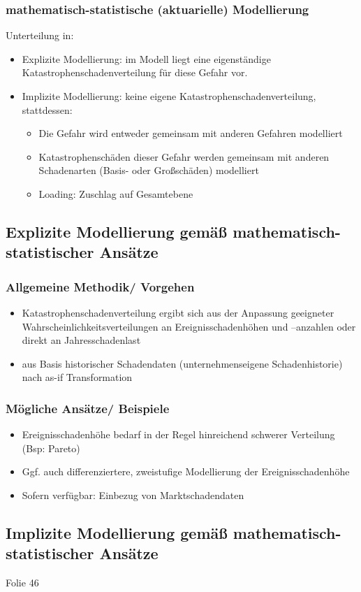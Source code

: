\documentclass[12pt]{report}
\theoremstyle{dotless}
\theoremstyle{definition}
\begin{document}
\subsubsection{mathematisch-statistische (aktuarielle) Modellierung}
Unterteilung in:
\begin{itemize}
\item Explizite Modellierung: im Modell liegt eine eigenständige Katastrophenschadenverteilung für diese Gefahr vor.
\item Implizite Modellierung: keine eigene Katastrophenschadenverteilung, stattdessen: 
\begin{itemize}
\item Die Gefahr wird entweder gemeinsam mit anderen Gefahren modelliert
\item Katastrophenschäden dieser Gefahr werden gemeinsam mit anderen Schadenarten (Basis- oder Großschäden) modelliert
\item Loading: Zuschlag auf Gesamtebene
\end{itemize}
\end{itemize}


\subsection{Explizite Modellierung gemäß mathematisch-statistischer Ansätze}

\subsubsection{Allgemeine Methodik/ Vorgehen}
\begin{itemize}
\item Katastrophenschadenverteilung ergibt sich aus der Anpassung geeigneter Wahrscheinlichkeitsverteilungen an Ereignisschadenhöhen und –anzahlen oder direkt an Jahresschadenlast
\item aus Basis historischer Schadendaten (unternehmenseigene Schadenhistorie) nach as-if Transformation
\end{itemize}

\subsubsection{Mögliche Ansätze/ Beispiele}
\begin{itemize}
\item Ereignisschadenhöhe bedarf in der Regel hinreichend schwerer Verteilung (Bsp: Pareto)
\item Ggf. auch differenziertere, zweistufige Modellierung der Ereignisschadenhöhe
\item Sofern verfügbar: Einbezug von Marktschadendaten
\end{itemize}


\subsection{Implizite Modellierung gemäß mathematisch-statistischer Ansätze}

Folie 46
\end{document}
